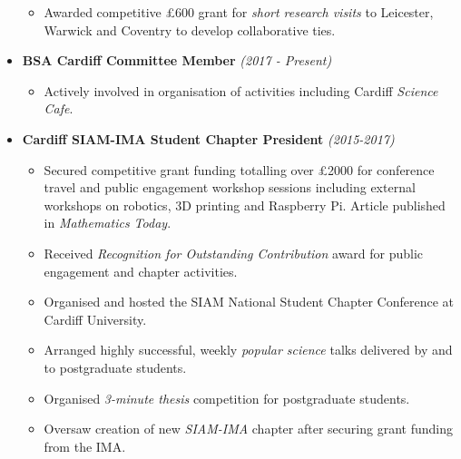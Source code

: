 \documentclass[10pt,a4paper,sans]{moderncv}        %
\begin{document}
\begin{itemize}
{\small{
\begin{itemize}	
	\item Awarded competitive £600 grant for \textit{short research visits} to Leicester, Warwick and Coventry to develop collaborative ties. 
\end{itemize}

}}

\vspace{4pt}

\item{\textbf{BSA Cardiff Committee Member} \textit{(2017 - Present)}

\vspace{4pt}

\small{
\begin{itemize}	
	\item Actively involved in organisation of activities including Cardiff \textit{Science Cafe}.
\end{itemize}
}}

\vspace{4pt}

\item{\textbf{Cardiff SIAM-IMA Student Chapter President} \textit{(2015-2017)}

\vspace{4pt}

\small{
\begin{itemize}	
	\item Secured competitive grant funding totalling over £2000 for conference travel and public engagement workshop sessions including external workshops on robotics, 3D printing and Raspberry Pi. Article published in \textit{Mathematics Today}.
	\vspace{3pt}
	\item Received \textit{Recognition for Outstanding Contribution} award for public engagement and chapter activities.
	\vspace{3pt}
	\item Organised and hosted the SIAM National Student Chapter Conference at Cardiff University.
	\vspace{3pt}
	\item Arranged highly successful, weekly \textit{popular science} talks delivered by and to postgraduate students.
	\vspace{3pt}
	\item Organised \textit{3-minute thesis} competition for postgraduate students.	
	\vspace{3pt}
	\item Oversaw creation of new \textit{SIAM-IMA} chapter after securing grant funding from the IMA.
\end{itemize}
}}

\end{itemize}
\end{document}
